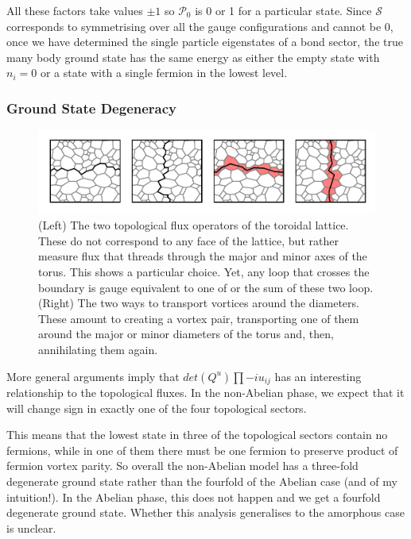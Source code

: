 All these factors take values \(\pm 1\) so \(\mathcal{P}_0\) is 0 or 1 for a particular state. Since \(\mathcal{S}\) corresponds to symmetrising over all the gauge configurations and cannot be 0, once we have determined the single particle eigenstates of a bond sector, the true many body ground state has the same energy as either the empty state with \(n_i = 0\) or a state with a single fermion in the lowest level.

\hypertarget{ground-state-degeneracy}{%
\subsubsection{Ground State Degeneracy}\label{ground-state-degeneracy}}

\begin{figure}
\hypertarget{fig:loops_and_dual_loops}{%
\centering
\includegraphics[width=1\textwidth,height=\textheight]{figure_code/amk_chapter/loops_and_dual_loops/loops_and_dual_loops.pdf}
\caption{(Left) The two topological flux operators of the toroidal lattice. These do not correspond to any face of the lattice, but rather measure flux that threads through the major and minor axes of the torus. This shows a particular choice. Yet, any loop that crosses the boundary is gauge equivalent to one of or the sum of these two loop. (Right) The two ways to transport vortices around the diameters. These amount to creating a vortex pair, transporting one of them around the major or minor diameters of the torus and, then, annihilating them again.}\label{fig:loops_and_dual_loops}
}
\end{figure}

More general arguments\autocite{chungExplicitMonodromyMoore2007,oshikawaTopologicalDegeneracyNonAbelian2007} imply that \(det(Q^u) \prod -i u_{ij}\) has an interesting relationship to the topological fluxes. In the non-Abelian phase, we expect that it will change sign in exactly one of the four topological sectors.

This means that the lowest state in three of the topological sectors contain no fermions, while in one of them there must be one fermion to preserve product of fermion vortex parity. So overall the non-Abelian model has a three-fold degenerate ground state rather than the fourfold of the Abelian case (and of my intuition!). In the Abelian phase, this does not happen and we get a fourfold degenerate ground state. Whether this analysis generalises to the amorphous case is unclear.

